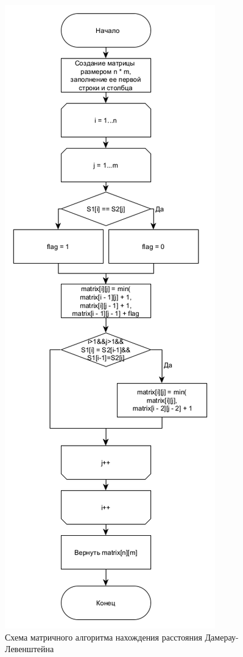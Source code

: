 \begin{figure}[h]
	\centering
	\includegraphics[scale = 0.65]{img/damer.png}
	\caption{Схема матричного алгоритма нахождения расстояния Дамерау-Левенштейна}
	\label{fig:damer}
\end{figure}
